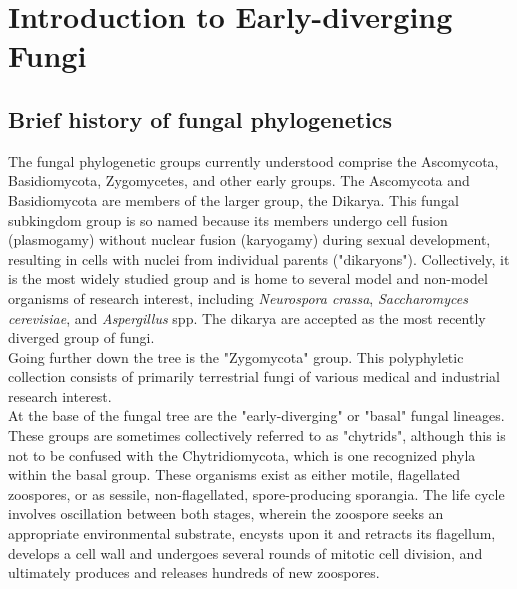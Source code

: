\chapter{Introduction to Early-diverging Fungi}
\section{Brief history of fungal phylogenetics}
The fungal phylogenetic groups currently understood comprise the Ascomycota, Basidiomycota, Zygomycetes, and other early groups. The Ascomycota and Basidiomycota are members of the larger group, the Dikarya. This fungal subkingdom group is so named because its members undergo cell fusion (plasmogamy) without nuclear fusion (karyogamy) during sexual development, resulting in cells with nuclei from individual parents ("dikaryons"). Collectively, it is the most widely studied group and is home to several model and non-model organisms of research interest, including \textit{Neurospora crassa}, \textit{Saccharomyces cerevisiae}, and \textit{Aspergillus} spp. The dikarya are accepted as the most recently diverged group of fungi. \\
\indent Going further down the tree is the "Zygomycota" group. This polyphyletic collection consists of primarily terrestrial fungi of various medical and industrial research interest.\\ 
\indent At the base of the fungal tree are the "early-diverging" or "basal" fungal lineages. These groups are sometimes collectively referred to as "chytrids", although this is not to be confused with the Chytridiomycota, which is one recognized phyla within the basal group. These organisms exist as either motile, flagellated zoospores, or as sessile, non-flagellated, spore-producing sporangia. The life cycle involves oscillation between both stages, wherein the zoospore seeks an appropriate environmental substrate, encysts upon it and retracts its flagellum, develops a cell wall and undergoes several rounds of mitotic cell division, and ultimately produces and releases hundreds of new zoospores. \\
